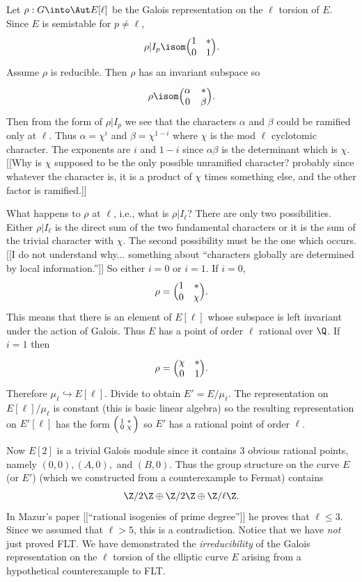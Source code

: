 \documentclass{report}
\begin{document}
Let $\rho:G\into\Aut E[\ell]$ be the Galois representation on the
$\ell$ torsion of $E$. Since $E$ is semistable
for $p\neq\ell$, $$\rho|I_p\isom
\Bigl(\begin{matrix}1&*\\0&1\end{matrix}\Bigr).$$
Assume $\rho$ is reducible. Then $\rho$ has an invariant subspace
so $$\rho\isom\Bigl(\begin{matrix}\alpha&*\\0&\beta\end{matrix}\Bigr).$$
Then from the form of $\rho|I_p$ we see that the characters
$\alpha$ and $\beta$ could be ramified only at $\ell$.
Thus $\alpha=\chi^i$ and $\beta=\chi^{1-i}$
where $\chi$ is the mod $\ell$ cyclotomic character. The exponents
are $i$ and $1-i$ since $\alpha\beta$ is the determinant which is
$\chi$. [[Why is $\chi$ supposed to be the only possible unramified
character? probably since whatever the character is, it is a product
of $\chi$ times something else, and the other factor is ramified.]]

What happens to $\rho$ at $\ell$, i.e., what is $\rho|I_{\ell}$? There
are only two possibilities. Either $\rho|I_{\ell}$ is the direct sum
of the two fundamental characters or it is the sum of the trivial character
with $\chi$. The second possibility must be the one which occurs. [[I
do not understand why... something about ``characters globally are determined
by local information.'']] So either $i=0$ or $i=1$. If $i=0$,
$$\rho=\Bigl(\begin{matrix}1&*\\0&\chi\end{matrix}\Bigr).$$
This means that there is an element of $E[\ell]$ whose subspace is
left invariant under the action of Galois. Thus $E$ has a point
of order $\ell$ rational over $\Q$. If $i=1$ then
$$\rho=\Bigl(\begin{matrix}\chi&*\\0&1\end{matrix}\Bigr).$$
Therefore $\mu_{\ell}\hookrightarrow E[\ell]$. Divide to obtain
$E'=E/\mu_{\ell}$. The representation on $E[\ell]/\mu_{\ell}$
is constant (this is basic linear algebra) so the resulting
representation on $E'[\ell]$ has the form
$\Bigl(\begin{smallmatrix}1&*\\0&\chi\end{smallmatrix}\Bigr)$
so $E'$ has a rational point of order $\ell$.

Now $E[2]$ is a trivial Galois module since it contains $3$
obvious rational points, namely $(0,0), (A,0),$ and $(B,0)$.
Thus the group structure on the curve $E$ (or $E'$) (which we constructed
from a counterexample to Fermat) contains
$$\Z/2\Z\oplus\Z/2\Z\oplus\Z/\ell\Z.$$
In Mazur's paper [[``rational isogenies of prime degree'']]
he proves that $\ell\leq 3$. Since we assumed that $\ell>5$, this
is a contradiction. Notice that we have {\em not} just proved FLT.
We have demonstrated the {\em irreducibility} of the Galois
representation on the $\ell$ torsion of the elliptic curve $E$
arising from a hypothetical counterexample to FLT.
\end{document}
